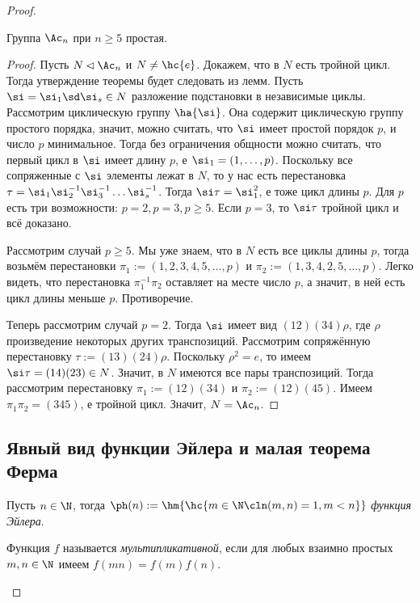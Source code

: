 \documentclass[a4paper]{article}
\begin{document}
\begin{proof}
\begin{theorem}
Группа $\Ac_n$ при $n \ge 5$ простая.
\end{theorem}
\begin{proof}
Пусть $N \lhd \Ac_n$ и $N \neq \hc{e}$. Докажем, что в $N$ есть тройной цикл.  Тогда утверждение теоремы
будет следовать из лемм. Пусть $\si = \si_1\sd \si_s \in N$ разложение подстановки в независимые циклы.
Рассмотрим циклическую группу $\ha{\si}$. Она содержит циклическую группу простого порядка, значит, можно
считать, что $\si$ имеет простой порядок $p$, и число $p$ минимальное. Тогда без ограничения общности можно
считать, что первый цикл в $\si$ имеет длину $p$, е $\si_1 = (1,\ldots,p)$. Поскольку все сопряженные с
$\si$ элементы лежат в $N$, то у нас есть перестановка $\tau=\si_1\si_2^{-1}\si_3^{-1}\ldots\si_s^{-1}$.
Тогда $\si\tau = \si_1^2$, е тоже цикл длины $p$. Для $p$ есть три возможности: $p=2, p=3, p \ge 5$. Если
$p=3$, то $\si\tau$ тройной цикл и всё доказано.

Рассмотрим случай $p \ge 5$. Мы уже знаем, что в $N$ есть все циклы длины $p$, тогда возьмём перестановки
$\pi_1:=(1,2,3,4,5,\ldots,p)$ и  $\pi_2:=(1,3,4,2,5,\ldots,p)$. Легко видеть, что перестановка
$\pi_1^{-1}\pi_2$ оставляет на месте число $p$, а значит, в ней есть цикл длины меньше $p$. Противоречие.

Теперь рассмотрим случай $p=2$. Тогда $\si$ имеет вид $(12)(34)\rho$,  где $\rho$ произведение некоторых
других транспозиций. Рассмотрим сопряжённую перестановку $\tau:=(13)(24)\rho$. Поскольку $\rho^2=e$, то имеем
$\si\tau = (14)(23) \in N$. Значит, в $N$ имеются все пары транспозиций. Тогда рассмотрим перестановку $\pi_1
:= (12)(34)$ и $\pi_2:=(12)(45)$. Имеем $\pi_1\pi_2 = (345)$, е тройной цикл. Значит, $N=\Ac_n$.
\end{proof}

\subsection{Явный вид функции Эйлера и малая теорема Ферма}
\begin{df}
Пусть $n \in \N$, тогда $\ph(n) := \hm{\hc{m \in \N\cln (m,n)=1, m < n}}$ \emph{функция Эйлера}.
\end{df}

\begin{df}
Функция $f$ называется \emph{мультипликативной}, если для любых взаимно простых $m, n \in \N$ имеем
$f(mn)=f(m)f(n)$.
\end{df}


\end{proof}
\end{document}
